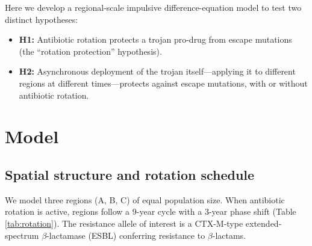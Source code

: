 \documentclass[12pt,a4paper]{article}
\begin{document}
\begin{table}[h]
\centering
\caption{Scale dependence of key parameters.}
\label{tab:scale}
\end{table}

Here we develop a regional-scale impulsive difference-equation model to test two distinct hypotheses:

\begin{itemize}
    \item \textbf{H1:} Antibiotic rotation protects a trojan pro-drug from escape mutations (the ``rotation protection'' hypothesis).
    \item \textbf{H2:} Asynchronous deployment of the trojan itself---applying it to different regions at different times---protects against escape mutations, with or without antibiotic rotation.
\end{itemize}

\section{Model}

\subsection{Spatial structure and rotation schedule}

We model three regions (A, B, C) of equal population size. When antibiotic rotation is active, regions follow a 9-year cycle with a 3-year phase shift (Table \ref{tab:rotation}). The resistance allele of interest is a CTX-M-type extended-spectrum $\beta$-lactamase (ESBL) conferring resistance to $\beta$-lactams.
\end{document}
